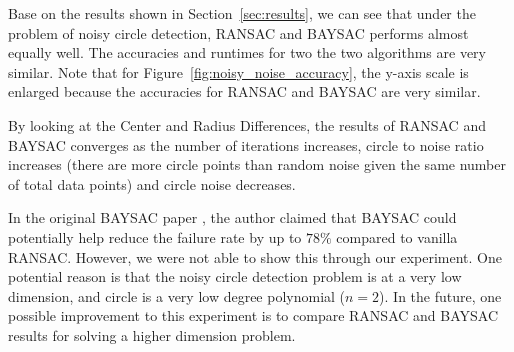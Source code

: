 \documentclass[10pt,twocolumn,letterpaper]{article}
\begin{document}
Base on the results shown in Section~\ref{sec:results}, we can see that under the problem of noisy circle detection, RANSAC and BAYSAC performs almost equally well.
The accuracies and runtimes for two the two algorithms are very similar. Note that for Figure~\ref{fig:noisy_noise_accuracy}, the y-axis scale is enlarged because the accuracies for RANSAC and BAYSAC are very similar.

By looking at the Center and Radius Differences, the results of RANSAC and BAYSAC converges as the number of iterations increases, circle to noise ratio increases (there are more circle points than random noise given the same number of total data points) and circle noise decreases.

In the original BAYSAC paper \cite{BaysacPaper}, the author claimed that BAYSAC could potentially help reduce the failure rate by up to $78\%$ compared to vanilla RANSAC. However, we were not able to show this through our experiment. One potential reason is that the noisy circle detection problem is at a very low dimension, and circle is a very low degree polynomial ($n = 2$). In the future, one possible improvement to this experiment is to compare RANSAC and BAYSAC results for solving a higher dimension problem.

\pagebreak
{\small
   
   
}
\end{document}
